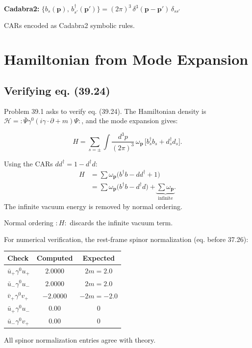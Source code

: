 \documentclass[12pt]{article}
\newcommand{\cdbexpr}[1]{\textcolor{cadblue}{$#1$}}
\newcommand{\verified}[1]{\textcolor{verifygreen}{\checkmark\; #1}}
\begin{document}
\textbf{Cadabra2:}
\cdbexpr{\{b_s(\mathbf{p}),\,b_{s'}^{\dagger}(\mathbf{p}')\}
  = (2\pi)^3\,\delta^3(\mathbf{p}-\mathbf{p}')\,\delta_{ss'}}

\verified{CARs encoded as Cadabra2 symbolic rules.}

\section{Hamiltonian from Mode Expansion}

\subsection{Verifying eq. (39.24)}

Problem 39.1 asks to verify eq. (39.24).
The Hamiltonian density is
$\mathcal{H} = :\bar\Psi\gamma^0(i\gamma\cdot\partial+m)\Psi:$,
and the mode expansion gives:
\begin{mdframed}[backgroundcolor=blue!5]
\begin{equation}
H = \sum_{s=\pm}\int\frac{d^3p}{(2\pi)^3}\,
\omega_{\mathbf{p}}\,
\bigl[ b_s^\dagger b_s + d_s^\dagger d_s \bigr] .
\tag{39.24}
\end{equation}
\end{mdframed}

Using the CARs $dd^\dagger = 1-d^\dagger d$:
\begin{align}
H &= \sum\omega_{\mathbf{p}}\bigl(b^\dagger b - dd^\dagger + 1\bigr) \\
  &= \sum\omega_{\mathbf{p}}\bigl(b^\dagger b - d^\dagger d\bigr) + \underbrace{\sum\omega_{\mathbf{p}}}_{\text{infinite}} .
\end{align}
The infinite vacuum energy is removed by normal ordering.

\begin{mdframed}[backgroundcolor=green!5]
\verified{Normal ordering $:\!H\!:$ discards the infinite vacuum term.}
\end{mdframed}

For numerical verification, the rest-frame spinor normalization (eq. before 37.26):
\begin{center}
\begin{tabular}{l|c|c}
Check & Computed & Expected \\ \hline
$\bar u_+\gamma^0 u_+$ & $2.0000$ & $2m=2.0$ \\
$\bar u_-\gamma^0 u_-$ & $2.0000$ & $2m=2.0$ \\
$\bar v_+\gamma^0 v_+$ & $-2.0000$ & $-2m=-2.0$ \\
$\bar u_+\gamma^0 u_-$ & $0.00$ & $0$ \\
$\bar u_-\gamma^0 v_+$ & $0.00$ & $0$ \\
\end{tabular}
\end{center}
\verified{All spinor normalization entries agree with theory.}
\end{document}
